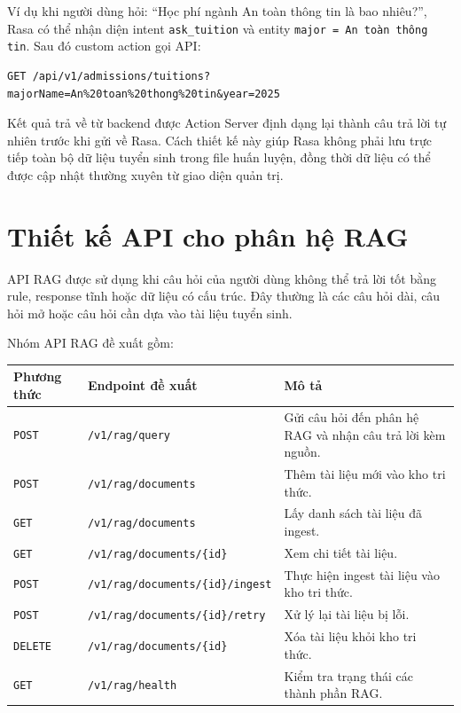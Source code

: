 \documentclass[12pt,a4paper]{report}
\begin{document}
Ví dụ khi người dùng hỏi: ``Học phí ngành An toàn thông tin là bao nhiêu?'', Rasa có thể nhận diện intent \texttt{ask\_tuition} và entity \texttt{major = An toàn thông tin}. Sau đó custom action gọi API:

\begin{verbatim}
GET /api/v1/admissions/tuitions?majorName=An%20toan%20thong%20tin&year=2025
\end{verbatim}

Kết quả trả về từ backend được Action Server định dạng lại thành câu trả lời tự nhiên trước khi gửi về Rasa. Cách thiết kế này giúp Rasa không phải lưu trực tiếp toàn bộ dữ liệu tuyển sinh trong file huấn luyện, đồng thời dữ liệu có thể được cập nhật thường xuyên từ giao diện quản trị.

\section{Thiết kế API cho phân hệ RAG}

API RAG được sử dụng khi câu hỏi của người dùng không thể trả lời tốt bằng rule, response tĩnh hoặc dữ liệu có cấu trúc. Đây thường là các câu hỏi dài, câu hỏi mở hoặc câu hỏi cần dựa vào tài liệu tuyển sinh.

Nhóm API RAG đề xuất gồm:

\begin{longtable}{|p{3cm}|p{5cm}|p{7cm}|}
\hline
\textbf{Phương thức} & \textbf{Endpoint đề xuất} & \textbf{Mô tả} \\
\hline
\texttt{POST} & \texttt{/v1/rag/query} & Gửi câu hỏi đến phân hệ RAG và nhận câu trả lời kèm nguồn. \\
\hline
\texttt{POST} & \texttt{/v1/rag/documents} & Thêm tài liệu mới vào kho tri thức. \\
\hline
\texttt{GET} & \texttt{/v1/rag/documents} & Lấy danh sách tài liệu đã ingest. \\
\hline
\texttt{GET} & \texttt{/v1/rag/documents/\{id\}} & Xem chi tiết tài liệu. \\
\hline
\texttt{POST} & \texttt{/v1/rag/documents/\{id\}/ingest} & Thực hiện ingest tài liệu vào kho tri thức. \\
\hline
\texttt{POST} & \texttt{/v1/rag/documents/\{id\}/retry} & Xử lý lại tài liệu bị lỗi. \\
\hline
\texttt{DELETE} & \texttt{/v1/rag/documents/\{id\}} & Xóa tài liệu khỏi kho tri thức. \\
\hline
\texttt{GET} & \texttt{/v1/rag/health} & Kiểm tra trạng thái các thành phần RAG. \\
\hline
\end{longtable}
\end{document}
